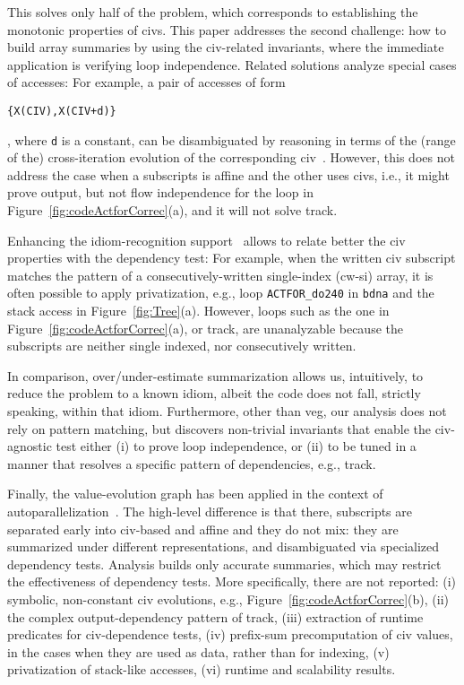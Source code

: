 \documentclass[10pt,nocopyrightspace]{sigplanconf}
\begin{document}
This solves only half of the problem, which   
corresponds to establishing the monotonic properties of {\sc civ}s.
This paper addresses the second challenge: 
how to build array summaries by using the {\sc civ}-related invariants,
where the immediate application is verifying loop independence. 
Related solutions analyze special cases of accesses:
%
For example, a pair of accesses of form  
\begin{small}{\tt\{X(CIV),X(CIV+d)\}}\end{small}, where {\tt d} is a constant,
can be disambiguated by reasoning in terms of the (range of the) cross-iteration 
evolution of the corresponding {\sc civ}~\cite{CohenBeyondMon}.
%
However, this does not address the case when a subscripts is affine
and the other uses {\sc civ}s, i.e., it might prove output, but not 
flow independence for the loop in Figure~\ref{fig:codeActforCorrec}(a), 
and it will not solve {\sc track}. 

Enhancing the idiom-recognition support~\cite{PaduaDemDrInterproc} 
allows to relate better the {\sc civ} properties with the dependency test: 
For example, when the written {\sc civ} subscript matches the pattern 
of a consecutively-written single-index ({\sc cw-si}) array, it is often
possible to apply privatization, e.g., loop {\tt ACTFOR\_do240} in {\tt bdna}
and the stack access in Figure~\ref{fig:Tree}(a). 
%
However, loops such as the one in Figure~\ref{fig:codeActforCorrec}(a),
or {\sc track}, are unanalyzable because the subscripts are neither single 
indexed, nor consecutively written.  

In comparison, over/under-estimate summarization allows us,
intuitively, to reduce the problem to a known idiom, albeit
the code does not fall, strictly speaking, within that idiom.
Furthermore, other than {\sc veg}, our analysis does not rely
on pattern matching, but discovers non-trivial invariants that
enable the {\sc civ}-agnostic test either (i) to prove loop independence,
or (ii) to be tuned in a manner that resolves a specific pattern 
of dependencies, e.g., {\sc track}.

Finally, the value-evolution graph has been applied in the context of 
autoparallelization~\cite{VEG}.   The high-level difference is that there, 
subscripts are separated early into {\sc civ}-based and affine and they 
do not mix: they are summarized under different representations, 
and disambiguated via specialized dependency tests.
Analysis builds only accurate summaries, which may restrict the
effectiveness of dependency tests. 
More specifically, there are not reported:
  (i)   symbolic, non-constant {\sc civ} evolutions,
        e.g., Figure~\ref{fig:codeActforCorrec}(b),
 (ii) the complex output-dependency pattern of {\sc track},
(iii) extraction of runtime predicates for {\sc civ}-dependence tests,
 (iv) prefix-sum precomputation of {\sc civ} values, in the
        cases when they are used as data, rather than for indexing,
  (v) privatization of stack-like accesses, 
 (vi) runtime and scalability results.
\end{document}
